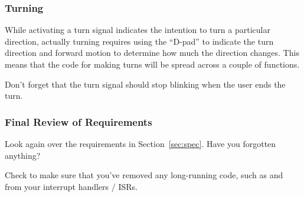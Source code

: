 \subsubsection{Turning}

While activating a turn signal indicates the intention to turn a particular direction, actually turning requires using the ``D-pad'' to indicate the turn direction and forward motion to determine how much the direction changes.
This means that the code for making turns will be spread across a couple of functions.

Don't forget that the turn signal should stop blinking when the user ends the turn.

\subsubsection{Final Review of Requirements}

Look again over the requirements in Section~\ref{sec:spec}.
Have you forgotten anything?

Check to make sure that you've removed any long-running code, such as  and  from your interrupt handlers / ISRs.
